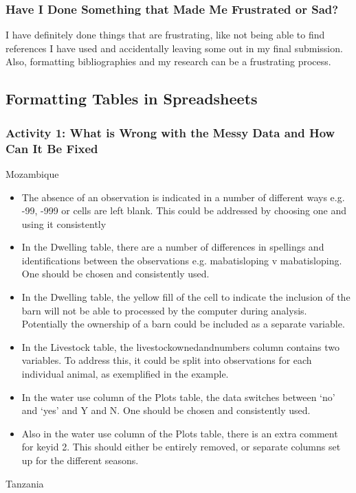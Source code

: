 \documentclass{article}
\begin{document}
\begin{FlushLeft}
\subsubsection*{Have I Done Something that Made Me Frustrated or Sad?}
I have definitely done things that are frustrating, like not being able to find references I have used and accidentally leaving some out in my final submission. Also, formatting bibliographies and my research can be a frustrating process.

\subsection{Formatting Tables in Spreadsheets}
\subsubsection*{Activity 1: What is Wrong with the Messy Data and How Can It Be Fixed}
Mozambique 
\begin{itemize}
\item The absence of an observation is indicated in a number of different ways e.g. -99, -999 or cells are left blank. This could be addressed by choosing one and using it consistently
\item In the Dwelling table, there are a number of differences in spellings and identifications between the observations e.g. mabati\textunderscore sloping v mabatisloping. One should be chosen and consistently used.
\item In the Dwelling table, the yellow fill of the cell to indicate the inclusion of the barn will not be able to processed by the computer during analysis. Potentially the ownership of a barn could be included as a separate variable.
\item In the Livestock table, the livestock\textunderscore owned\textunderscore and\textunderscore numbers column contains two variables. To address this, it could be split into observations for each individual animal, as exemplified in the example.
\item In the water use column of the Plots table, the data switches between ‘no’ and ‘yes’ and Y and N. One should be chosen and consistently used.
\item Also in the water use column of the Plots table, there is an extra comment for key\textunderscore id 2. This should either be entirely removed, or separate columns set up for the different seasons.
\end{itemize}
Tanzania
\begin{itemize}

\end{itemize}
\end{FlushLeft}
\end{document}
